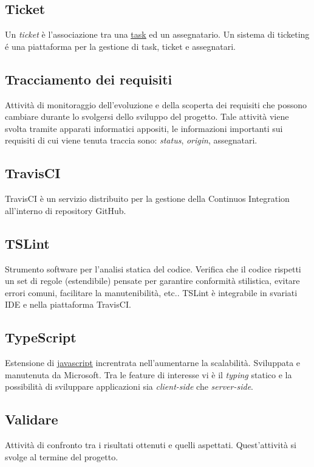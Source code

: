 	\subsection{Ticket}
	\label{sec:telegram}
	Un \emph{ticket} è l'associazione tra una \underline{\hyperref[sec:task]{task}} ed un assegnatario. Un sistema di ticketing é una piattaforma per la gestione di task, ticket e assegnatari.


	\subsection{Tracciamento dei requisiti}
	\label{sec:tracciamentorequisiti}
	Attività di monitoraggio dell'evoluzione e della scoperta dei requisiti che possono cambiare durante lo svolgersi dello sviluppo del progetto. Tale attività viene svolta tramite apparati informatici appositi, le informazioni importanti sui requisiti di cui viene tenuta traccia sono: \emph{status}, \emph{origin}, assegnatari.
	\subsection{TravisCI}
	\label{sec:travisci}
	TravisCI è un servizio distribuito per la gestione della Continuos Integration all'interno di repository GitHub.
	\subsection{TSLint}
	\label{sec:tslint}
	Strumento software per l'analisi statica del codice. Verifica che il codice rispetti un set di regole (estendibile) pensate per garantire conformità stilistica, evitare errori comuni, facilitare la manutenibilità, etc.. TSLint è integrabile in svariati IDE e nella piattaforma TravisCI.

	\subsection{TypeScript}
	\label{sec:typescript}
	Estensione di \underline{\hyperref[sec:javascript]{javascript}} increntrata nell'aumentarne la scalabilità. Sviluppata e manutenuta da Microsoft. Tra le feature di interesse vi è il \emph{typing} statico e la possibilità di sviluppare applicazioni sia \emph{client-side} che \emph{server-side}.

	\newpage


	\subsection{Validare}
	\label{sec:validare}
	Attività di confronto tra i risultati ottenuti e quelli aspettati. Quest'attività si svolge al termine del progetto.


